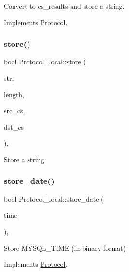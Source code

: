 Convert to cs\+\_\+results and store a string. 

Implements \mbox{\hyperlink{classProtocol}{Protocol}}.

\mbox{\label{classProtocol__local_aa29b67ca49f2c3ed42914cd3e3f8ec3a}} 
\subsubsection{\texorpdfstring{store()}{store()}\hspace{0.1cm}{\footnotesize\ttfamily [2/2]}}
{\footnotesize\ttfamily bool Protocol\+\_\+local\+::store (\begin{DoxyParamCaption}\item[{const char $\ast$}]{str,  }\item[{size\+\_\+t}]{length,  }\item[{const C\+H\+A\+R\+S\+E\+T\+\_\+\+I\+N\+FO $\ast$}]{src\+\_\+cs,  }\item[{const C\+H\+A\+R\+S\+E\+T\+\_\+\+I\+N\+FO $\ast$}]{dst\+\_\+cs }\end{DoxyParamCaption})\hspace{0.3cm}{\ttfamily [protected]}, {\ttfamily [virtual]}}

Store a string. \mbox{\label{classProtocol__local_a18671f3eea92ec56936c5b3ad6c89675}} 
\subsubsection{\texorpdfstring{store\+\_\+date()}{store\_date()}}
{\footnotesize\ttfamily bool Protocol\+\_\+local\+::store\+\_\+date (\begin{DoxyParamCaption}\item[{M\+Y\+S\+Q\+L\+\_\+\+T\+I\+ME $\ast$}]{time }\end{DoxyParamCaption})\hspace{0.3cm}{\ttfamily [protected]}, {\ttfamily [virtual]}}

Store M\+Y\+S\+Q\+L\+\_\+\+T\+I\+ME (in binary format) 

Implements \mbox{\hyperlink{classProtocol}{Protocol}}.

